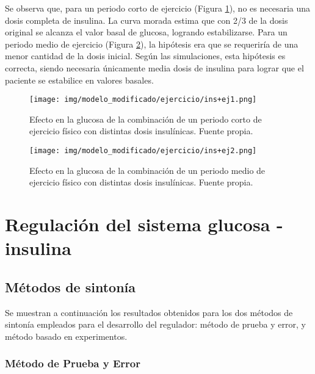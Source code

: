Se observa que, para un periodo corto de ejercicio (Figura \ref{fig:ins+ej1}), no es necesaria una dosis completa de insulina. La curva morada estima que con 2/3 de la dosis original se alcanza el valor basal de glucosa, logrando estabilizarse. Para un periodo medio de ejercicio (Figura \ref{fig:ins+ej2}), la hipótesis era que se requeriría de una menor cantidad de la dosis inicial. Según las simulaciones, esta hipótesis es correcta, siendo necesaria únicamente media dosis de insulina para lograr que el paciente se estabilice en valores basales.

\begin{figure}[htbp]
    \centering
    \texttt{[image: img/modelo\_modificado/ejercicio/ins+ej1.png]}
    \caption{Efecto en la glucosa de la combinación de un periodo corto de ejercicio físico con distintas dosis insulínicas. Fuente propia.}
    \label{fig:ins+ej1}
\end{figure}
\clearpage
\begin{figure}[htbp]
    \centering
    \texttt{[image: img/modelo\_modificado/ejercicio/ins+ej2.png]}
    \caption{Efecto en la glucosa de la combinación de un periodo medio de ejercicio físico con distintas dosis insulínicas. Fuente propia.}
    \label{fig:ins+ej2}
\end{figure}

\section{Regulación del sistema glucosa - insulina}
\subsection{Métodos de sintonía}

Se muestran a continuación los resultados obtenidos para los dos métodos de sintonía empleados para el desarrollo del regulador: método de prueba y error, y método basado en experimentos.

\subsubsection{Método de Prueba y Error}

